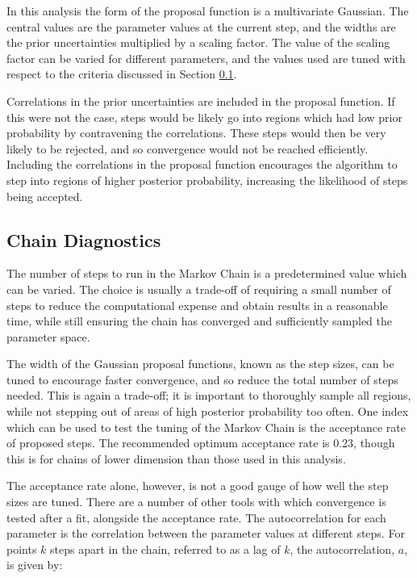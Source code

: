 In this analysis the form of the proposal function is a multivariate Gaussian. The central values are the parameter values at the current step, and the widths are the prior uncertainties multiplied by a scaling factor. The value of the scaling factor can be varied for different parameters, and the values used are tuned with respect to the criteria discussed in Section \ref{sec:diag}.

Correlations in the prior uncertainties are included in the proposal function. If this were not the case, steps would be likely go into regions which had low prior probability by contravening the correlations. These steps would then be very likely to be rejected, and so convergence would not be reached efficiently. Including the correlations in the proposal function encourages the algorithm to step into regions of higher posterior probability, increasing the likelihood of steps being accepted.

\subsection{Chain Diagnostics}\label{sec:diag}

The number of steps to run in the Markov Chain is a predetermined value which can be varied. The choice is usually a trade-off of requiring a small number of steps to reduce the computational expense and obtain results in a reasonable time, while still ensuring the chain has converged and sufficiently sampled the parameter space. 

The width of the Gaussian proposal functions, known as the step sizes, can be tuned to encourage faster convergence, and so reduce the total number of steps needed. This is again a trade-off; it is important to thoroughly sample all regions, while not stepping out of areas of high posterior probability too often. One index which can be used to test the tuning of the Markov Chain is the acceptance rate of proposed steps. The recommended optimum acceptance rate is 0.23\cite{accrate}, though this is for chains of lower dimension than those used in this analysis. 

The acceptance rate alone, however, is not a good gauge of how well the step sizes are tuned. There are a number of other tools with which convergence is tested after a fit, alongside the acceptance rate. The autocorrelation for each parameter is the correlation between the parameter values at different steps. For points $k$ steps apart in the chain, referred to as a lag of $k$, the autocorrelation, $a$, is given by:

